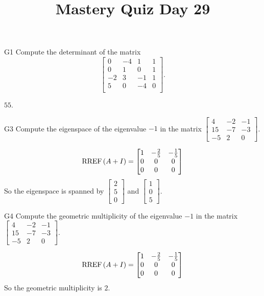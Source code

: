 \documentclass{sbgLAquiz}
\title{Mastery Quiz Day 29 }
\begin{document}
\begin{problem}{G1}
Compute the determinant of the matrix
\[
  \begin{bmatrix}
    0 & -4 & 1 & 1 \\
    0 & 1 & 0 & 1 \\
    -2 & 3 & -1 & 1 \\
    5 & 0 & -4 & 0 \\
  \end{bmatrix}
.\]
\end{problem}
\begin{solution}
\(55\).
\end{solution}

\begin{problem}{G3}
Compute the eigenspace of the eigenvalue $-1$ in the matrix $\begin{bmatrix} 4 & -2 & -1 \\ 15 & -7 & -3 \\ -5 & 2 & 0 \end{bmatrix}$. 
\end{problem}
\begin{solution}
$$\operatorname{RREF}\left(A+I\right) = \begin{bmatrix} 1 & - \frac{2}{5} & -\frac{1}{5} \\ 0 & 0 & 0 \\ 0 & 0 & 0 \end{bmatrix}$$
So the eigenspace is spanned by $\begin{bmatrix} 2 \\5 \\  0 \end{bmatrix}$ and $\begin{bmatrix} 1 \\ 0 \\ 5 \end{bmatrix}$.
\end{solution}


\begin{extract}\newpage\end{extract}
\begin{problem}{G4}
Compute the geometric multiplicity of the eigenvalue $-1$ in the matrix $\begin{bmatrix} 4 & -2 & -1 \\ 15 & -7 & -3 \\ -5 & 2 & 0 \end{bmatrix}$.  \end{problem}
\begin{solution}
$$\operatorname{RREF}\left(A+I\right) = \begin{bmatrix} 1 & - \frac{2}{5} & -\frac{1}{5} \\ 0 & 0 & 0 \\ 0 & 0 & 0 \end{bmatrix}$$
So the geometric multiplicity is $2$.
\end{solution}
\end{document}

